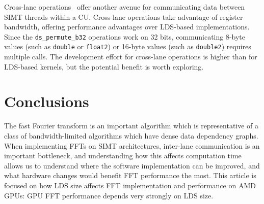 \documentclass[blind]{gtac}
\begin{document}
Cross-lane operations~\cite{crosslane} offer another avenue for
communicating data between SIMT threads within a CU.  Cross-lane
operations take advantage of register bandwidth, offering performance
advantages over LDS-based implementations.  Since the
\texttt{ds_permute_b32} operations work on 32 bits, communicating
8-byte values (such as \texttt{double} or \texttt{float2}) or 16-byte
values (such as \texttt{double2}) requires multiple calls.  The
development effort for cross-lane operations is higher than for
LDS-based kernels, but the potential benefit is worth exploring.






\section{Conclusions}

The fast Fourier transform is an important algorithm which is
representative of a class of bandwidth-limited algorithms which have
dense data dependency graphs.  When implementing FFTs on SIMT
architectures, inter-lane communication is an important bottleneck,
and understanding how this affects computation time allows us to
understand where the software implementation can be improved, and what
hardware changes would benefit FFT performance the most.  This article
is focused on how LDS size affects FFT implementation and performance
on AMD GPUs: GPU FFT performance depends very strongly on LDS size.
\end{document}
